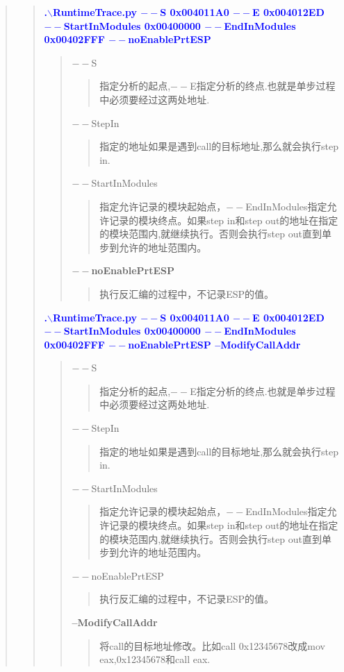\documentclass[AutoFakeBold,AutoFakeSlant]{article}
\begin{document}
\begin{flushleft}
\begin{quote}
\begin{quote}
		    \textcolor{blue}{ \textbf{ \Large
			.$\backslash$RuntimeTrace.py $--$S 0x004011A0 $--$E 0x004012ED $--$StartInModules 0x00400000 $--$EndInModules 0x00402FFF $--$noEnablePrtESP }} \\
			\begin{quote}
				$--$S \begin{quote}指定分析的起点,$--$E指定分析的终点.也就是单步过程中必须要经过这两处地址.\end{quote}
				$--$StepIn \begin{quote}指定的地址如果是遇到call的目标地址,那么就会执行step in.\end{quote}
				$--$StartInModules \begin{quote}指定允许记录的模块起始点，$--$EndInModules指定允许记录的模块终点。如果step in和step out的地址在指定的模块范围内,就继续执行。否则会执行step out直到单步到允许的地址范围内。\end{quote}
				\textbf{$--$noEnablePrtESP} \begin{quote}执行反汇编的过程中，不记录ESP的值。\end{quote}
			\end{quote}
			
			\bigskip			
			
			\textcolor{blue}{ \textbf{ \Large
			.$\backslash$RuntimeTrace.py $--$S 0x004011A0 $--$E 0x004012ED $--$StartInModules 0x00400000 $--$EndInModules 0x00402FFF $--$noEnablePrtESP --ModifyCallAddr }} \\
			\begin{quote}
				$--$S \begin{quote}指定分析的起点,$--$E指定分析的终点.也就是单步过程中必须要经过这两处地址.\end{quote}
				$--$StepIn \begin{quote}指定的地址如果是遇到call的目标地址,那么就会执行step in.\end{quote}
				$--$StartInModules \begin{quote}指定允许记录的模块起始点，$--$EndInModules指定允许记录的模块终点。如果step in和step out的地址在指定的模块范围内,就继续执行。否则会执行step out直到单步到允许的地址范围内。\end{quote}
				$--$noEnablePrtESP \begin{quote}执行反汇编的过程中，不记录ESP的值。\end{quote}
				\textbf{--ModifyCallAddr} \begin{quote}将call的目标地址修改。比如call 0x12345678改成mov eax,0x12345678和call eax. \end{quote}
			\end{quote}
			

\end{quote}
\end{quote}
\end{flushleft}
\end{document}
